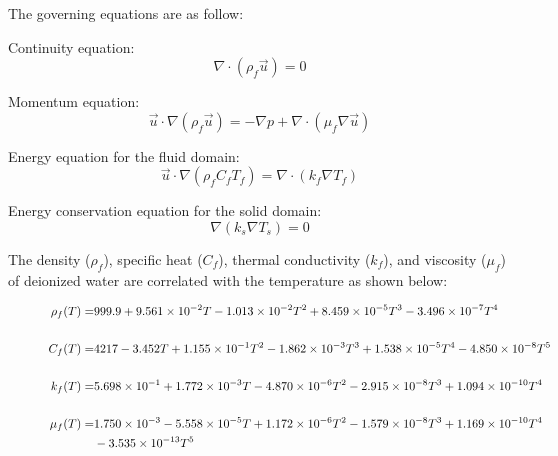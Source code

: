 The governing equations are as follow:

Continuity equation:
\begin{equation}
    \nabla \cdot \left(\rho_f \vec{u}\right)=0
\end{equation}

Momentum equation:
\begin{equation}
    \vec{u} \cdot \nabla\left(\rho_f \vec{u}\right)=-\nabla p+\nabla \cdot\left(\mu_f \nabla \vec{u}\right)
\end{equation}

Energy equation for the fluid domain:
\begin{equation}
    \vec{u} \cdot \nabla\left(\rho_f C_{f} T_f\right)=\nabla \cdot\left(k_f \nabla T_f\right)
\end{equation}

Energy conservation equation for the solid domain:
\begin{equation}
    \nabla\left(k_s \nabla T_s\right)=0
\end{equation}
\textcolor{red}{}


The density ($\rho_{f}$), specific heat ($C_{f}$), thermal conductivity ($k_{f}$), and viscosity ($\mu_{f}$) of deionized water are correlated with the temperature as shown below:

\begin{figure*}[htb] %
    \begin{align}
        \rho_{f}(T)= & 999.9+9.561 \times 10^{-2} T-1.013 \times 10^{-2} T^{2}+8.459 \times 10^{-5} T^{3}-3.496 \times 10^{-7} T^{4}                      \\ \notag\\
        C_{f}(T)=    & 4217-3.452 T+1.155 \times 10^{-1} T^{2}-1.862 \times 10^{-3} T^{3}+1.538 \times10^{-5}T^{4}-4.850 \times 10^{-8} T^{5}             \\ \notag\\
        k_{f}(T)=    & 5.698 \times 10^{-1}+1.772 \times 10^{-3} T-4.870 \times 10^{-6} T^{2}-2.915 \times10^{-8} T^{3}+1.094 \times 10^{-10} T^{4}       \\ \notag\\
        \mu_{f}(T)=  & 1.750 \times 10^{-3}-5.558 \times 10^{-5} T+1.172 \times 10^{-6} T^{2}-1.579 \times10^{-8} T^{3}+1.169 \times 10^{-10} T^{4}\notag \\
                     & -3.535 \times 10^{-13} T^{5}
    \end{align}
\end{figure*}



